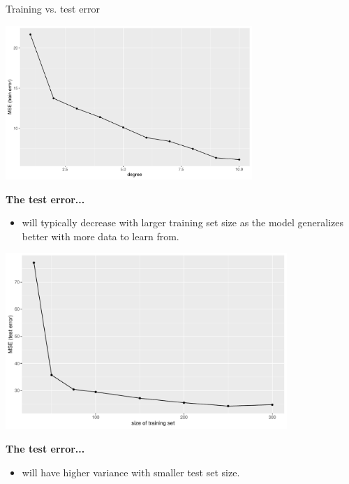\begin{vbframe}{Training vs. test error}
\begin{center}
\includegraphics[width=0.7\textwidth]{figure/fig-train-vs-test-error-4}
\end{center}

\framebreak

\textbf{The test error...}

\begin{itemize}
  \item will typically decrease with larger training set size as the model 
  generalizes better with more data to learn from.
  
\end{itemize}
\begin{center}
\includegraphics[width=0.8\textwidth]{figure/fig-train-vs-test-error-2}
\end{center} 

\framebreak
\textbf{The test error...}

\begin{itemize}  
  
  \item will have higher variance with smaller test set size.


\end{itemize}
\end{vbframe}
